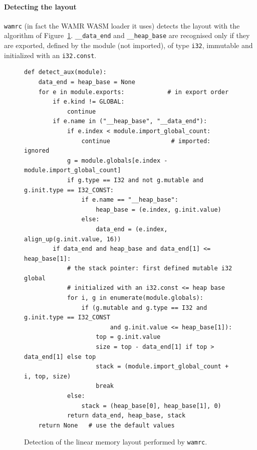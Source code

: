 \documentclass{article}
\begin{document}
\paragraph{Detecting the layout}

\texttt{wamrc} (in fact the WAMR WASM loader it uses) detects the layout with the algorithm of Figure~\ref{figure:aux-detection}.
\verb|__data_end| and \verb|__heap_base| are recognised only if they are exported, defined by the module (not imported), of type \verb|i32|, immutable and initialized with an \verb|i32.const|.

\begin{figure}[H]
\begin{verbatim}
def detect_aux(module):
    data_end = heap_base = None
    for e in module.exports:            # in export order
        if e.kind != GLOBAL:
            continue
        if e.name in ("__heap_base", "__data_end"):
            if e.index < module.import_global_count:
                continue                 # imported: ignored
            g = module.globals[e.index - module.import_global_count]
            if g.type == I32 and not g.mutable and g.init.type == I32_CONST:
                if e.name == "__heap_base":
                    heap_base = (e.index, g.init.value)
                else:
                    data_end = (e.index, align_up(g.init.value, 16))
        if data_end and heap_base and data_end[1] <= heap_base[1]:
            # the stack pointer: first defined mutable i32 global
            # initialized with an i32.const <= heap base
            for i, g in enumerate(module.globals):
                if (g.mutable and g.type == I32 and g.init.type == I32_CONST
                        and g.init.value <= heap_base[1]):
                    top = g.init.value
                    size = top - data_end[1] if top > data_end[1] else top
                    stack = (module.import_global_count + i, top, size)
                    break
            else:
                stack = (heap_base[0], heap_base[1], 0)
            return data_end, heap_base, stack
    return None   # use the default values
\end{verbatim}
\caption{Detection of the linear memory layout performed by \texttt{wamrc}.}
\label{figure:aux-detection}
\end{figure}
\end{document}
